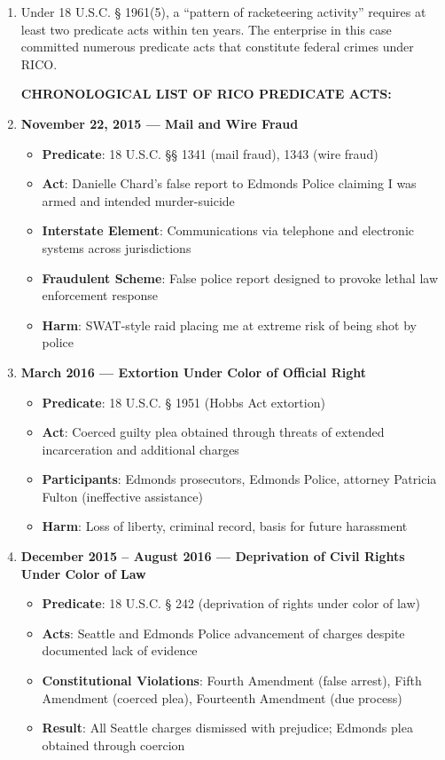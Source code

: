 \documentclass[12pt,letterpaper]{article}
\begin{document}
\begin{enumerate}
\item Under 18 U.S.C. § 1961(5), a ``pattern of racketeering activity'' requires at least two predicate acts within ten years. The enterprise in this case committed numerous predicate acts that constitute federal crimes under RICO.

\textbf{CHRONOLOGICAL LIST OF RICO PREDICATE ACTS:}

\item \textbf{November 22, 2015 --- Mail and Wire Fraud}

\begin{itemize}
\item \textbf{Predicate}: 18 U.S.C. §§ 1341 (mail fraud), 1343 (wire fraud)
\item \textbf{Act}: Danielle Chard's false report to Edmonds Police claiming I was armed and intended murder-suicide
\item \textbf{Interstate Element}: Communications via telephone and electronic systems across jurisdictions
\item \textbf{Fraudulent Scheme}: False police report designed to provoke lethal law enforcement response
\item \textbf{Harm}: SWAT-style raid placing me at extreme risk of being shot by police
\end{itemize}

\item \textbf{March 2016 --- Extortion Under Color of Official Right}

\begin{itemize}
\item \textbf{Predicate}: 18 U.S.C. § 1951 (Hobbs Act extortion)
\item \textbf{Act}: Coerced guilty plea obtained through threats of extended incarceration and additional charges
\item \textbf{Participants}: Edmonds prosecutors, Edmonds Police, attorney Patricia Fulton (ineffective assistance)
\item \textbf{Harm}: Loss of liberty, criminal record, basis for future harassment
\end{itemize}

\item \textbf{December 2015 -- August 2016 --- Deprivation of Civil Rights Under Color of Law}

\begin{itemize}
\item \textbf{Predicate}: 18 U.S.C. § 242 (deprivation of rights under color of law)
\item \textbf{Acts}: Seattle and Edmonds Police advancement of charges despite documented lack of evidence
\item \textbf{Constitutional Violations}: Fourth Amendment (false arrest), Fifth Amendment (coerced plea), Fourteenth Amendment (due process)
\item \textbf{Result}: All Seattle charges dismissed with prejudice; Edmonds plea obtained through coercion
\end{itemize}


\end{enumerate}
\end{document}
